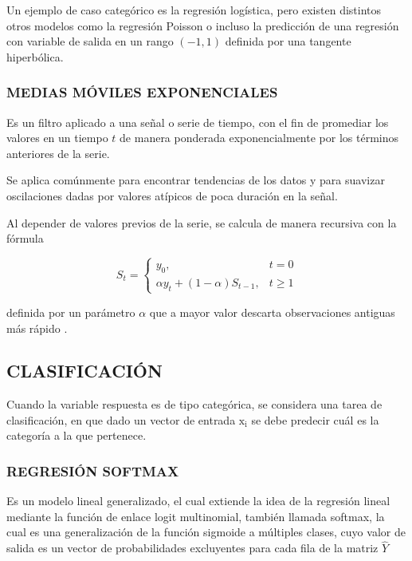     		Un ejemplo de caso categórico es la regresión logística, pero existen distintos otros modelos como la regresión Poisson o incluso la predicción de una regresión con variable de salida en un rango $(-1, 1)$ definida por una tangente hiperbólica.
    		
    	\subsubsection{MEDIAS MÓVILES EXPONENCIALES}
    		Es un filtro aplicado a una señal o serie de tiempo, con el fin de promediar los valores en un tiempo $t$ de manera ponderada exponencialmente por los términos anteriores de la serie.
    		
    		Se aplica comúnmente para encontrar tendencias de los datos y para suavizar oscilaciones dadas por valores atípicos de poca duración en la señal.
    		
    		Al depender de valores previos de la serie, se calcula de manera recursiva con la fórmula
    		
    		\begin{equation}
    			S_t = \begin{cases}
    				y_0, & t=0\\
    				\alpha y_t + (1 - \alpha)S_{t-1}, & t \ge 1
    			\end{cases}
    		\end{equation}
    	
    		definida por un parámetro $\alpha$ que a mayor valor descarta observaciones antiguas más rápido \citep{10.5555/3002669}.
    	
    \subsection{CLASIFICACIÓN}
        Cuando la variable respuesta es de tipo categórica, se considera una tarea de clasificación, en que dado un vector de entrada $\mathrm{x_i}$ se debe predecir cuál es la categoría a la que pertenece. \citep{hastie01statisticallearning}
        \subsubsection{REGRESIÓN SOFTMAX}
        Es un modelo lineal generalizado, el cual extiende la idea de la regresión lineal mediante la función de enlace logit multinomial, también llamada softmax, la cual es una generalización de la función sigmoide a múltiples clases, cuyo valor de salida es un vector de probabilidades excluyentes para cada fila de la matriz $\hat{Y}$
        

